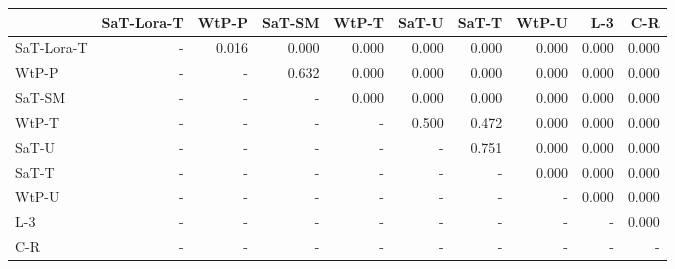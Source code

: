 \begin{tabular}{lrrrrrrrrr}
\toprule
 & SaT-Lora-T & WtP-P & SaT-SM & WtP-T & SaT-U & SaT-T & WtP-U & L-3 & C-R \\
\midrule
SaT-Lora-T & - & 0.016 & 0.000 & 0.000 & 0.000 & 0.000 & 0.000 & 0.000 & 0.000 \\
WtP-P & - & - & 0.632 & 0.000 & 0.000 & 0.000 & 0.000 & 0.000 & 0.000 \\
SaT-SM & - & - & - & 0.000 & 0.000 & 0.000 & 0.000 & 0.000 & 0.000 \\
WtP-T & - & - & - & - & 0.500 & 0.472 & 0.000 & 0.000 & 0.000 \\
SaT-U & - & - & - & - & - & 0.751 & 0.000 & 0.000 & 0.000 \\
SaT-T & - & - & - & - & - & - & 0.000 & 0.000 & 0.000 \\
WtP-U & - & - & - & - & - & - & - & 0.000 & 0.000 \\
L-3 & - & - & - & - & - & - & - & - & 0.000 \\
C-R & - & - & - & - & - & - & - & - & - \\
\bottomrule
\end{tabular}

